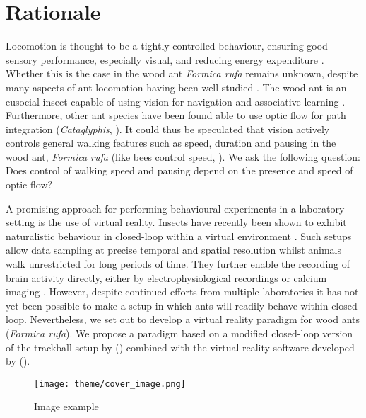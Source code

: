 \chapter{Rationale}
\label{chap:rationale}

Locomotion is thought to be a tightly controlled behaviour, ensuring good sensory performance, especially visual, and reducing energy expenditure \autocites{Benichou2011IntermittentStrategies, Kramer2001}. Whether this is the case in the wood ant \textit{Formica rufa} remains unknown, despite many aspects of ant locomotion having been well studied \autocites{Lipp2005, Wahl2015}. The wood ant is an eusocial insect capable of using vision for navigation \autocite{Harris2007} and associative learning \autocite{Fernandes2017a}. Furthermore, other ant species have been found able to use optic flow for path integration (\textit{Cataglyphis}, \citealt{Ronacher1995, Pfeffer2016}). It could thus be speculated that vision actively controls general walking features such as speed, duration and pausing in the wood ant, \textit{Formica rufa} (like bees control speed, \cite{Schone1996, Linander2015}). We ask the following question: Does control of walking speed and pausing depend on the presence and speed of optic flow?

A promising approach for performing behavioural experiments in a laboratory setting is the use of virtual reality. Insects have recently been shown to exhibit naturalistic behaviour in closed-loop within a virtual environment \autocites{Takalo2012, Buatois2017, Seelig2010}. Such setups allow data sampling at precise temporal and spatial resolution whilst animals walk unrestricted for long periods of time. They further enable the recording of brain activity directly, either by electrophysiological recordings or calcium imaging \autocite{Seelig2010}. However, despite continued efforts from multiple laboratories it has not yet been possible to make a setup in which ants will readily behave within closed-loop. Nevertheless, we set out to develop a virtual reality paradigm for wood ants (\textit{Formica rufa}). We propose a paradigm based on a modified closed-loop version of the trackball setup by \citeauthor{Dahmen2017} (\citeyear{Dahmen2017}) combined with the virtual reality software developed by \citeauthor{Aronov2014b} (\citeyear{Aronov2014b}).

\begin{figure}[h]
    \centering
    \texttt{[image: theme/cover\_image.png]}
    \caption{Image example}
    \label{fig:image_example}
\end{figure}